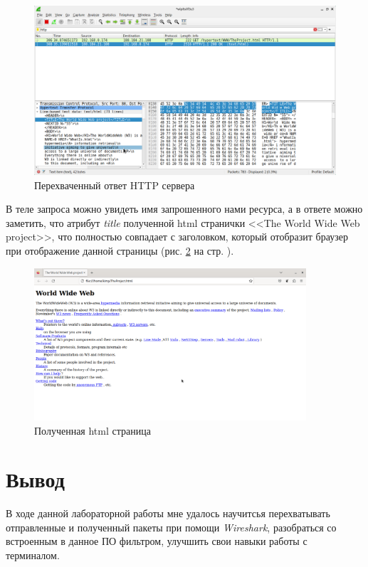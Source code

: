 \documentclass[a4paper]{article}
\begin{document}
  \begin{figure}[H]
    \centering
    \includegraphics[width=1.0\textwidth]{01_0009}
    \caption{Перехваченный ответ HTTP сервера}
    \label{img:0009}
  \end{figure}
  В теле запроса можно увидеть имя запрошенного нами ресурса, а в ответе можно заметить, что
  атрибут \textit{title} полученной html странички <<The World Wide Web project>>, что 
  полностью совпадает с заголовком, который отобразит браузер при отображение данной страницы
  (рис. \ref{img:0010} на стр. \pageref{img:0010}).
  \begin{figure}[H]
    \centering
    \includegraphics[width=0.9\textwidth]{01_0010}
    \caption{Полученная html страница}
    \label{img:0010}
  \end{figure}
  \section{Вывод}
  В ходе данной лабораторной работы мне удалось научитсья перехватывать отправленные и
  полученный пакеты при помощи \textit{Wireshark}, разобраться со встроенным в данное 
  ПО фильтром, улучшить свои навыки работы с терминалом.
\end{document}
